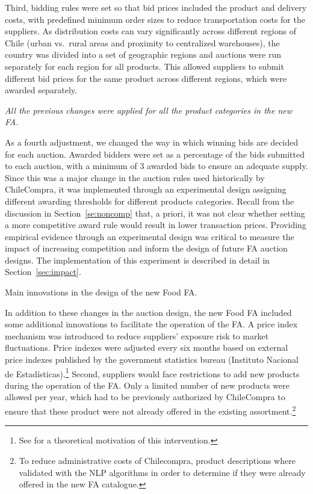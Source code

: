 Third, bidding rules were set so that bid prices included the product and delivery costs, with predefined minimum order sizes to reduce transportation costs for the suppliers. As distribution costs can vary significantly across different regions of Chile (urban vs.~rural areas and proximity to centralized warehouses), the country was divided into a set of geographic regions and auctions were run separately for each region for all products. This allowed suppliers to submit different bid prices for the same product across different regions, which were awarded separately.

\textit{All the previous changes were applied for all the product categories in the new FA. }

As a fourth adjustment, we changed the way in which winning bids are decided for each auction. Awarded bidders were set as a percentage of the bids submitted to each auction, with a minimum of 3 awarded bids to ensure an adequate supply. Since this was a major change in the auction rules used historically by ChileCompra, it was implemented through an experimental design  assigning different awarding thresholds for different products categories.  Recall from the discussion in Section~\ref{se:noncomp} that, a priori, it was not clear whether setting a more competitive award rule would result in lower transaction prices.  Providing empirical evidence through an experimental design was critical to measure the impact of increasing competition and inform the design of future FA auction designs. The implementation of this  experiment is described in detail in Section~\ref{sec:impact}.

\begin{table}[]
\caption{Main innovations in the design of the new Food FA.}
    \centering \small{
    } 
    \label{tab:improvements}
\end{table}

In addition to these changes in the auction design, the new Food FA included some additional innovations to facilitate the operation of the FA. A price index mechanism was introduced to reduce suppliers' exposure risk to market fluctuations. Price indexes were adjusted every six months based on external price indexes published by the government statistics bureau (Instituto Nacional de Estad\'isticas).\footnote{See \cite{gur2017framework} for a theoretical motivation of this intervention.} Second, suppliers would face restrictions to add new products during the operation of the FA. Only a limited number of new products were allowed per year, which had to be previously authorized by ChileCompra to ensure that these product were not already offered in the existing assortment.\footnote{To reduce administrative costs of Chilecompra, product descriptions where validated with the NLP algorithms in order to determine if they were already offered in the new FA catalogue.}

